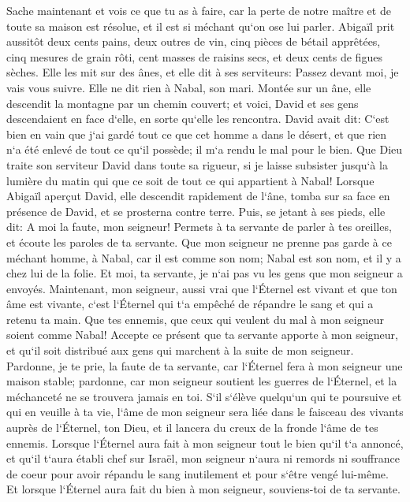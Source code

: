 \verse Sache maintenant et vois ce que tu as à faire, car la perte de notre maître et de toute sa maison est résolue, et il est si méchant qu`on ose lui parler. 
\verse Abigaïl prit aussitôt deux cents pains, deux outres de vin, cinq pièces de bétail apprêtées, cinq mesures de grain rôti, cent masses de raisins secs, et deux cents de figues sèches. Elle les mit sur des ânes, 
\verse et elle dit à ses serviteurs: Passez devant moi, je vais vous suivre. Elle ne dit rien à Nabal, son mari. 
\verse Montée sur un âne, elle descendit la montagne par un chemin couvert; et voici, David et ses gens descendaient en face d`elle, en sorte qu`elle les rencontra. 
\verse David avait dit: C`est bien en vain que j`ai gardé tout ce que cet homme a dans le désert, et que rien n`a été enlevé de tout ce qu`il possède; il m`a rendu le mal pour le bien. 
\verse Que Dieu traite son serviteur David dans toute sa rigueur, si je laisse subsister jusqu`à la lumière du matin qui que ce soit de tout ce qui appartient à Nabal! 
\verse Lorsque Abigaïl aperçut David, elle descendit rapidement de l`âne, tomba sur sa face en présence de David, et se prosterna contre terre. 
\verse Puis, se jetant à ses pieds, elle dit: A moi la faute, mon seigneur! Permets à ta servante de parler à tes oreilles, et écoute les paroles de ta servante. 
\verse Que mon seigneur ne prenne pas garde à ce méchant homme, à Nabal, car il est comme son nom; Nabal est son nom, et il y a chez lui de la folie. Et moi, ta servante, je n`ai pas vu les gens que mon seigneur a envoyés. 
\verse Maintenant, mon seigneur, aussi vrai que l`Éternel est vivant et que ton âme est vivante, c`est l`Éternel qui t`a empêché de répandre le sang et qui a retenu ta main. Que tes ennemis, que ceux qui veulent du mal à mon seigneur soient comme Nabal! 
\verse Accepte ce présent que ta servante apporte à mon seigneur, et qu`il soit distribué aux gens qui marchent à la suite de mon seigneur. 
\verse Pardonne, je te prie, la faute de ta servante, car l`Éternel fera à mon seigneur une maison stable; pardonne, car mon seigneur soutient les guerres de l`Éternel, et la méchanceté ne se trouvera jamais en toi. 
\verse S`il s`élève quelqu`un qui te poursuive et qui en veuille à ta vie, l`âme de mon seigneur sera liée dans le faisceau des vivants auprès de l`Éternel, ton Dieu, et il lancera du creux de la fronde l`âme de tes ennemis. 
\verse Lorsque l`Éternel aura fait à mon seigneur tout le bien qu`il t`a annoncé, et qu`il t`aura établi chef sur Israël, 
\verse mon seigneur n`aura ni remords ni souffrance de coeur pour avoir répandu le sang inutilement et pour s`être vengé lui-même. Et lorsque l`Éternel aura fait du bien à mon seigneur, souviens-toi de ta servante. 

